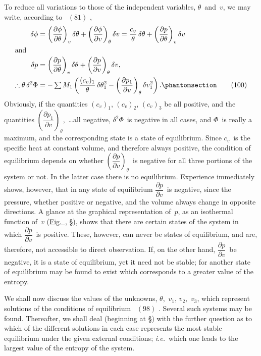 \documentclass[12pt]{book}[2005/09/16]
\newcommand{\Chg}[2]{#2}
\newcommand{\Add}[1]{\Chg{}{#1}}
\newcommand{\SecRef}[2][§\;]{\hyperref[section:#2.]{{\upshape #1#2}}}
\newcommand{\Tag}[1]{%
  \phantomsection\label{eqn:#1}\tag*{\ensuremath{#1}}%
}
\newcommand{\Eq}[1]{%
  \hyperref[eqn:#1]{\ensuremath{#1}}%
}
\newcommand{\Fig}[1]{\hyperref[fig:#1]{Fig.~{\upshape #1}}}
\newcommand{\PageSep}[1]{\ignorespaces}
\newcommand{\ie}{\emph{i.e.}}
\newcommand{\dd}{\partial}
\newcommand{\tsum}{\mathop{\textstyle\sum}\limits}
\begin{document}
To reduce all variations to those of the independent
variables, $\theta$~and~$v$, we may write, according to~\Eq{(81)},
\begin{align*}
\delta \phi &= \left(\frac{\dd \phi}{\dd \theta}\right)_{v} \delta \theta + \left(\frac{\dd \phi}{\dd v}\right)_{\theta} \delta v
  = \frac{c_{v}}{\theta}\, \delta \theta + \left(\frac{\dd p}{\dd \theta}\right)_{v} \delta v \\
\intertext{and}
\delta p &= \left(\frac{\dd p}{\dd \theta}\right)_{v} \delta \theta + \left(\frac{\dd p}{\dd v}\right)_{\theta} \delta v, \\
\therefore
\theta\, \delta^{2} \Phi &= -\tsum M_{1} \left(\frac{(c_{v})_{1}}{\theta}\, \delta \theta_{1}^{2} - \left(\frac{\dd p_{1}}{\dd v}\right)_{\theta} \delta v_{1}^{2}\right).
\Tag{(100)}
\end{align*}
Obviously, if the quantities $(c_{v})_{1}$, $(c_{v})_{2}$, $(c_{v})_{3}$ be all positive,
and the quantities $\left(\dfrac{\dd p_{1}}{\dd v}\right)_{\theta}$\Add{,}~\dots all negative, $\delta^{2} \Phi$~is
negative in all cases, and $\Phi$~is really a maximum, and the
corresponding state is a state of equilibrium. Since $c_{v}$~is
the specific heat at constant volume, and therefore always
positive, the condition of equilibrium depends on whether
$\left(\dfrac{\dd p}{\dd v}\right)_{\theta}$~is negative for all three portions of the system or not.
In the latter case there is no equilibrium. Experience
immediately shows, however, that in any state of equilibrium
$\dfrac{\dd p}{\dd v}$~is negative, since the pressure, whether positive
or negative, and the volume always change in opposite
directions. A glance at the graphical representation of~$p$,
as an isothermal function of~$v$ (\Fig{1}, \SecRef{26}), shows that
there are certain states of the system in which $\dfrac{\dd p}{\dd v}$~is positive.
These, however, can never be states of equilibrium,
and are, therefore, not accessible to direct observation. If,
on the other hand, $\dfrac{\dd p}{\dd v}$~be negative, it is a state of equilibrium,
yet it need not be stable; for another state of
equilibrium may be found to exist which corresponds to
a greater value of the entropy.

We shall now discuss the values of the unknowns, $\theta$,~$v_{1}$,
$v_{2}$,~$v_{3}$, which represent solutions of the conditions of equilibrium~\Eq{(98)}.
Several such systems may be found. Thereafter,
we shall deal (beginning at \SecRef{189}) with the further
\PageSep{138}
question as to which of the different solutions in each case
represents the most stable equilibrium under the given
external conditions; \ie\ which one leads to the largest
value of the entropy of the system.
\end{document}
